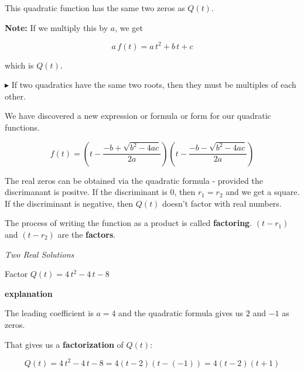 \documentclass{ximera}
\begin{document}
This quadratic function has the same two zeros as $Q(t)$.  


\textbf{Note:} If we multiply this by $a$, we get 


\[ a \, f(t) = a \, t^2 + b \, t + c \]

which is $Q(t)$.


$\blacktriangleright$ If two quadratics have the same two roots, then they must be multiples of each other.






We have discovered a new expression or formula or form for our quadratic functions.





\[ f(t) =  \left(t - \frac{-b + \sqrt{b^2 - 4 a c}}{2a}\right)   \left(t -  \frac{-b - \sqrt{b^2 - 4 a c}}{2a}\right)   \]



















The real zeros can be obtained via the quadratic formula - provided the discrimanant is positve.  If the discriminant is $0$, then $r_1 = r_2$ and we get a square.  If the discriminant is negative, then $Q(t)$ doesn't factor with real numbers.  


The process of writing the function as a product is called \textbf{factoring}. $(t - r_1)$  and $(t - r_2)$ are the \textbf{factors}.



\begin{example} \textit{Two Real Solutions} 

Factor $Q(t) = 4 \, t^2 - 4 \, t - 8$ 


\textbf{\textcolor{red!75!green}{explanation}} 


The leading coefficient is $a=4$ and the quadratic formula gives us $2$ and $-1$ as zeros.  

That gives us a \textbf{factorization} of $Q(t)$:



\[    Q(t) = 4 \, t^2 - 4 \, t - 8 =  4 (t-2)(t-(-1))    = 4 (t-2)(t+1)         \]



\end{example}
\end{document}
